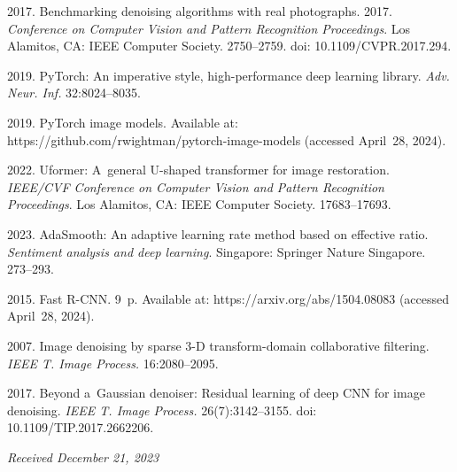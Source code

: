 \begin{multicols}{2}
{{\begin{thebibliography}{99}
    
     2017. Benchmarking denoising algorithms with
    real photographs. 2017. \textit{Conference on Computer Vision and Pattern Recognition Proceedings}. 
Los Alamitos, CA: IEEE Computer Society. 
2750--2759. doi: 10.1109/CVPR.2017.294.
    
     2019.
    PyTorch: An imperative style, high-performance deep learning library.
\textit{Adv. Neur. Inf.} 32:8024--8035.

\pagebreak
   
     2019. PyTorch image models.
    Available at: {\sf https://github.com/rwightman/pytorch-image-models} (accessed April~28, 2024).
   
     2022.
    Uformer: A~general U-shaped transformer for image restoration. 
\textit{IEEE/CVF Conference on Computer Vision and Pattern Recognition Proceedings}. Los Alamitos, CA:
 IEEE Computer Society. 17683--17693.
    
     2023. AdaSmooth: An adaptive learning rate method based on effective
    ratio. \textit{Sentiment analysis and deep learning}.  Singapore: Springer Nature Singapore. 273--293.
    

   
     2015.
    Fast {R-CNN}. 9~p.  
    Available at: {\sf https://arxiv.org/abs/1504.08083} (accessed April~28, 2024).
    
     2007.
    Image denoising by sparse 3-D transform-domain collaborative filtering. 
    \textit{IEEE T. Image Process.}  16:2080--2095.
    
     2017.
    Beyond a~Gaussian denoiser: Residual learning of deep CNN for image denoising. 
\textit{IEEE T. Image Process.}  26(7):3142--3155. 
    doi: 10.1109/TIP.2017.2662206.
\end{thebibliography}

 }
 }

\end{multicols}

\vspace*{-6pt}

\hfill{\small\textit{Received December 21, 2023}} 

